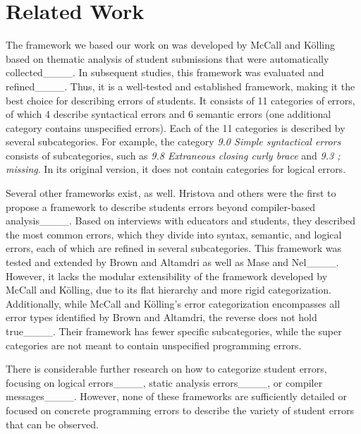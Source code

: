 \section{Related Work}
The framework we based our work on was developed by McCall and Kölling based on thematic analysis of student submissions that were automatically collected____. In subsequent studies, this framework was evaluated and refined____. Thus, it is a well-tested and established framework, making it the best choice for describing errors of students. It consists of 11 categories of errors, of which 4 describe syntactical errors and 6 semantic errors (one additional category contains unspecified errors). Each of the 11 categories is described by several subcategories. For example, the category \emph{9.0 Simple syntactical errors} consists of subcategories, such as \emph{9.8 Extraneous closing curly brace} and \emph{9.3 ; missing}. In its original version, it does not contain categories for logical errors.

Several other frameworks exist, as well. Hristova and others were the first to propose a framework to describe students errors beyond compiler-based analysis____. Based on interviews with educators and students, they described the most common errors, which they divide into syntax, semantic, and logical errors, each of which are refined in several subcategories. This framework was tested and extended by Brown and Altamdri as well as Mase and Nel____. However, it lacks the modular extensibility of the framework developed by McCall and Kölling, due to its flat hierarchy and more rigid categorization. Additionally, while McCall and Kölling's error categorization encompasses all error types identified by Brown and Altamdri, the reverse does not hold true____. Their framework has fewer specific subcategories, while the super categories are not meant to contain unspecified programming errors.

There is considerable further research on how to categorize student errors, focusing on logical errors____, static analysis errors____, or compiler messages____. However, none of these frameworks are sufficiently detailed or focused on concrete programming errors to describe the variety of student errors that can be observed.

